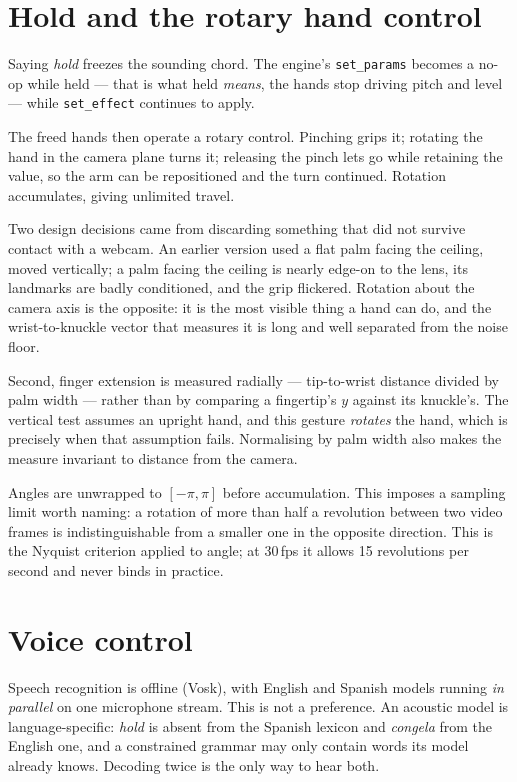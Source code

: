 \documentclass[a4paper,11pt]{article}
\newcommand{\code}[1]{\texttt{\small #1}}
\begin{document}
\section{Hold and the rotary hand control}
\label{sec:hold}

Saying \emph{hold} freezes the sounding chord. The engine's \code{set\_params}
becomes a no-op while held --- that is what held \emph{means}, the hands stop
driving pitch and level --- while \code{set\_effect} continues to apply.

The freed hands then operate a rotary control. Pinching grips it; rotating the
hand in the camera plane turns it; releasing the pinch lets go while retaining
the value, so the arm can be repositioned and the turn continued. Rotation
accumulates, giving unlimited travel.

Two design decisions came from discarding something that did not survive
contact with a webcam. An earlier version used a flat palm facing the ceiling,
moved vertically; a palm facing the ceiling is nearly edge-on to the lens, its
landmarks are badly conditioned, and the grip flickered. Rotation about the
camera axis is the opposite: it is the most visible thing a hand can do, and
the wrist-to-knuckle vector that measures it is long and well separated from
the noise floor.

Second, finger extension is measured radially --- tip-to-wrist distance divided
by palm width --- rather than by comparing a fingertip's $y$ against its
knuckle's. The vertical test assumes an upright hand, and this gesture
\emph{rotates} the hand, which is precisely when that assumption fails.
Normalising by palm width also makes the measure invariant to distance from the
camera.

Angles are unwrapped to $[-\pi,\pi]$ before accumulation. This imposes a
sampling limit worth naming: a rotation of more than half a revolution between
two video frames is indistinguishable from a smaller one in the opposite
direction. This is the Nyquist criterion applied to angle; at 30\,fps it allows
15 revolutions per second and never binds in practice.

\section{Voice control}
\label{sec:voice}

Speech recognition is offline (Vosk), with English and Spanish models running
\emph{in parallel} on one microphone stream. This is not a preference. An
acoustic model is language-specific: \emph{hold} is absent from the Spanish
lexicon and \emph{congela} from the English one, and a constrained grammar may
only contain words its model already knows. Decoding twice is the only way to
hear both.
\end{document}
